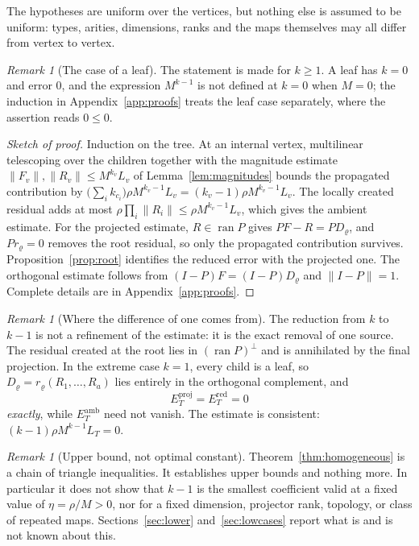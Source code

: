 \documentclass[11pt]{amsart}
\theoremstyle{definition}
\theoremstyle{remark}
\newtheorem{remark}[theorem]{Remark}
\newcommand{\ran}{\operatorname{ran}}
\newcommand{\norm}[1]{\lVert#1\rVert}
\newcommand{\amb}{\mathrm{amb}}
\newcommand{\proj}{\mathrm{proj}}
\newcommand{\red}{\mathrm{red}}
\begin{document}
The hypotheses are uniform over the vertices, but nothing else is assumed to be uniform:
types, arities, dimensions, ranks and the maps themselves may all differ from vertex to
vertex.

\begin{remark}[The case of a leaf]
\label{rem:leaf}
The statement is made for $k\ge1$. A leaf has $k=0$ and error $0$, and the expression
$M^{k-1}$ is not defined at $k=0$ when $M=0$; the induction in
Appendix~\ref{app:proofs} treats the leaf case separately, where the assertion reads
$0\le0$.
\end{remark}

\begin{proof}[Sketch of proof]
Induction on the tree. At an internal vertex, multilinear telescoping over the children
together with the magnitude estimate $\norm{F_v},\norm{R_v}\le M^{k_v}L_v$ of
Lemma~\ref{lem:magnitudes} bounds the propagated contribution by
$\bigl(\sum_ik_{c_i}\bigr)\rho M^{k_v-1}L_v=(k_v-1)\rho M^{k_v-1}L_v$. The locally created
residual adds at most $\rho\prod_i\norm{R_i}\le\rho M^{k_v-1}L_v$, which gives the ambient
estimate. For the projected estimate, $R\in\ran P$ gives $PF-R=PD_\varrho$, and
$Pr_\varrho=0$ removes the root residual, so only the propagated contribution survives.
Proposition~\ref{prop:root} identifies the reduced error with the projected one. The
orthogonal estimate follows from $(I-P)F=(I-P)D_\varrho$ and $\norm{I-P}=1$. Complete
details are in Appendix~\ref{app:proofs}.
\end{proof}

\begin{remark}[Where the difference of one comes from]
\label{rem:kminusone}
The reduction from $k$ to $k-1$ is not a refinement of the estimate: it is the exact
removal of one source. The residual created at the root lies in $(\ran P)^\perp$ and is
annihilated by the final projection. In the extreme case $k=1$, every child is a leaf, so
$D_\varrho=r_\varrho(R_1,\ldots,R_a)$ lies entirely in the orthogonal complement, and
\[
 E_T^{\proj}=E_T^{\red}=0
\]
\emph{exactly}, while $E_T^{\amb}$ need not vanish. The estimate is consistent:
$(k-1)\rho M^{k-1}L_T=0$.
\end{remark}

\begin{remark}[Upper bound, not optimal constant]
\label{rem:notsharp}
Theorem~\ref{thm:homogeneous} is a chain of triangle inequalities. It establishes upper
bounds and nothing more. In particular it does not show that $k-1$ is the smallest
coefficient valid at a fixed value of $\eta=\rho/M>0$, nor for a fixed dimension,
projector rank, topology, or class of repeated maps. Sections~\ref{sec:lower}
and~\ref{sec:lowcases} report what is and is not known about this.
\end{remark}
\end{document}
